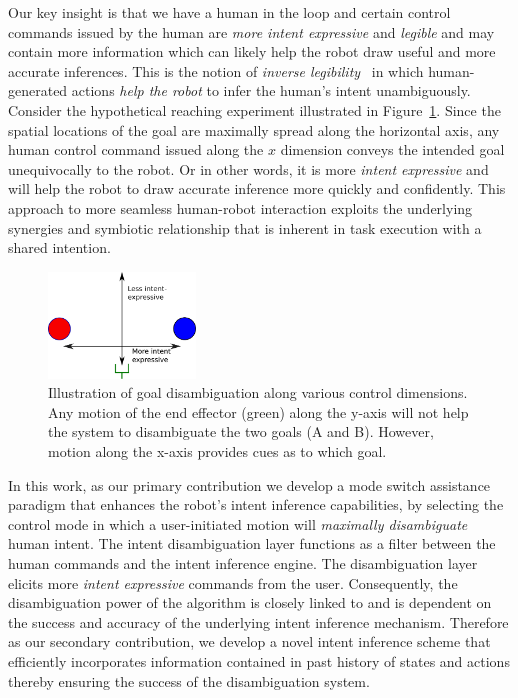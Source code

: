 Our key insight is that we have a human in the loop and certain control commands issued by the human are \textit{more intent expressive} and \textit{legible} and may contain more information which can likely help the robot draw useful and more accurate inferences. This is the notion of \textit{inverse legibility}~\cite{gopinath2017mode} in which human-generated actions \textit{help the robot} to infer the human's intent unambiguously. Consider the hypothetical reaching experiment illustrated in Figure~\ref{fig:disamb}. Since the spatial locations of the goal are maximally spread along the horizontal axis, any human control command issued along the $x$ dimension conveys the intended goal unequivocally to the robot. Or in other words, it is more \textit{intent expressive} and will help the robot to draw accurate inference more quickly and confidently. This approach to more seamless human-robot interaction exploits the underlying synergies and symbiotic relationship that is inherent in task execution with a shared intention. 
\begin{figure}
	\begin{center}
		\includegraphics[width=0.35\textwidth]{./figures/Fig2_Disamb.eps}
	\end{center}
	\caption{Illustration of goal disambiguation along various control dimensions. Any motion of the end effector (green) along the y-axis will not help the system to disambiguate the two goals (A and B). However, motion along the x-axis provides cues as to which goal.}
	\label{fig:disamb}
\end{figure}

In this work, as our primary contribution we develop a mode switch assistance paradigm that enhances the robot's intent inference capabilities, by selecting the control mode in which a user-initiated motion will \textit{maximally disambiguate} human intent. The intent disambiguation layer functions as a filter between the human commands and the intent inference engine. The disambiguation layer elicits more \textit{intent expressive} commands from the user. Consequently, the disambiguation power of the algorithm is closely linked to and is dependent on the success and accuracy of the underlying intent inference mechanism. Therefore as our secondary contribution, we develop a novel intent inference scheme that efficiently incorporates information contained in past history of states and actions thereby ensuring the success of the disambiguation system. 

